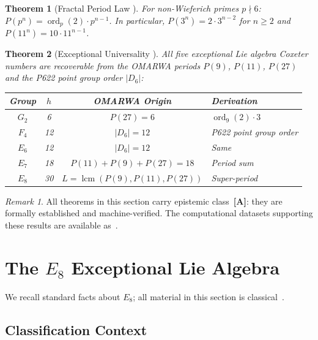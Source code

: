 \documentclass[11pt, a4paper]{article}
\theoremstyle{plain}
\newtheorem{theorem}{Theorem}[section]
\theoremstyle{definition}
\theoremstyle{remark}
\newtheorem{remark}{Remark}[section]
\newcommand{\ord}{\operatorname{ord}}
\DeclareMathOperator{\lcm}{lcm}
\begin{document}
\begin{theorem}[Fractal Period Law {\cite[Thm.~3.5]{paket2}}]
\label{thm:fractal}
For non-Wieferich primes $p \nmid 6$:
$P(p^n) = \ord_p(2) \cdot p^{n-1}$.
In particular, $P(3^n) = 2 \cdot 3^{n-2}$ for $n \geq 2$ and
$P(11^n) = 10 \cdot 11^{n-1}$.
\end{theorem}

\begin{theorem}[Exceptional Universality {\cite[Thm.~11.1]{paket2}}]
\label{thm:exceptional}
All five exceptional Lie algebra Coxeter numbers are recoverable from
the OMARWA periods $P(9)$, $P(11)$, $P(27)$ and the P622 point group
order $|D_6|$:

\smallskip
\begin{center}
\begin{tabular}{@{}cccl@{}}
\toprule
Group & $h$ & OMARWA Origin & Derivation \\
\midrule
$G_2$ & 6  & $P(27) = 6$ & $\ord_9(2) \cdot 3$\\
$F_4$ & 12 & $|D_6| = 12$ & P622 point group order \\
$E_6$ & 12 & $|D_6| = 12$ & Same \\
$E_7$ & 18 & $P(11) + P(9) + P(27) = 18$ & Period sum \\
$E_8$ & 30 & $L = \lcm(P(9), P(11), P(27))$ & Super-period \\
\bottomrule
\end{tabular}
\end{center}
\end{theorem}

\begin{remark}
All theorems in this section carry epistemic class~\textbf{[A]}:
they are formally established and machine-verified. The computational
datasets supporting these results are available as~\cite{paket3}.
\end{remark}

\section{The $E_8$ Exceptional Lie Algebra}
\label{sec:e8}

We recall standard facts about $E_8$; all material in this section is
classical~\cite{humphreys,bourbaki}.

\subsection{Classification Context}
\end{document}
